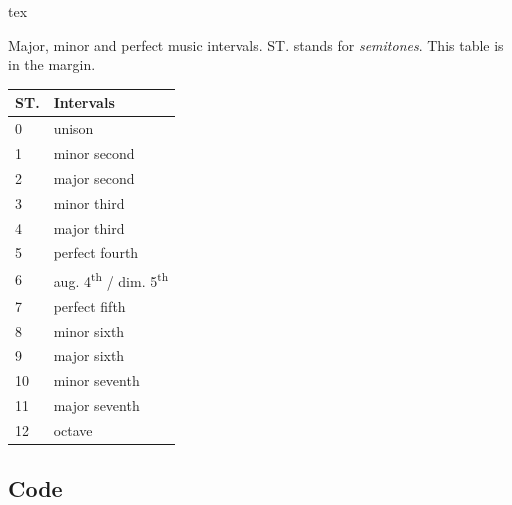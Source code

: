 \begin{codebox}{tex}
    \begin{margintable}[]\small
        \caption{Major, minor and perfect music intervals. ST. stands for \textit{semitones}. This table is in the margin. \label{tab:table-margin}}
        \begin{tabular}{ll}
            \toprule
            \textbf{ST.} & \textbf{Intervals}                                      \\
            \midrule
            0            & unison                                                  \\
            1            & minor second                                            \\
            2            & major second                                            \\
            3            & minor third                                             \\
            4            & major third                                             \\
            5            & perfect fourth                                          \\
            6            & aug. 4\textsuperscript{th} / dim. 5\textsuperscript{th} \\
            7            & perfect fifth                                           \\
            8            & minor sixth                                             \\
            9            & major sixth                                             \\
            10           & minor seventh                                           \\
            11           & major seventh                                           \\
            12           & octave                                                  \\
            \bottomrule
        \end{tabular}
    \end{margintable}
\end{codebox}


\subsection{Code}
\label{sub:code}

